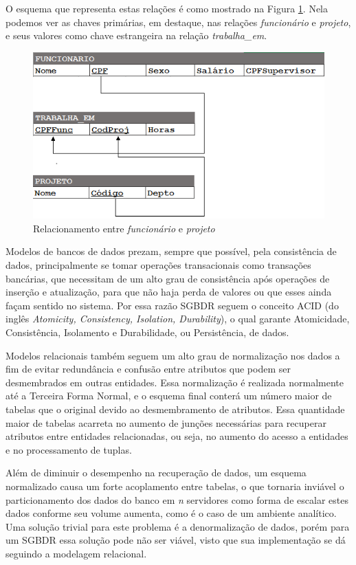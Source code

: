 O esquema que representa estas relações é como mostrado na Figura \ref{fig:relacao_func_proj}. Nela podemos ver as chaves primárias, em destaque, nas relações \textit{funcionário} e \textit{projeto}, e seus valores como chave estrangeira na relação \textit{trabalha\_em}. 

\begin{figure}[htpb]
	\centering
		\includegraphics[width=13cm]{relacao_func_proj}
	\caption{Relacionamento entre \textit{funcionário} e \textit{projeto}}
	\label{fig:relacao_func_proj}
\end{figure}

Modelos de bancos de dados prezam, sempre que possível, pela consistência de dados, principalmente se tomar operações transacionais como transações bancárias, que necessitam de um alto grau de consistência após operações de inserção e atualização, para que não haja perda de valores ou que esses ainda façam sentido no sistema. Por essa razão SGBDR seguem o conceito ACID (do inglês \textit{Atomicity, Consistency, Isolation, Durability}), o qual garante Atomicidade, Consistência, Isolamento e Durabilidade, ou Persistência, de dados. 

Modelos relacionais também seguem um alto grau de normalização nos dados a fim de evitar redundância e confusão entre atributos que podem ser desmembrados em outras entidades. Essa normalização é realizada normalmente até a Terceira Forma Normal, e o esquema final conterá um número maior de tabelas que o original devido ao desmembramento de atributos. Essa quantidade maior de tabelas acarreta no aumento de junções necessárias para recuperar atributos entre entidades relacionadas, ou seja, no aumento do acesso a entidades e no processamento de tuplas.

Além de diminuir o desempenho na recuperação de dados, um esquema normalizado causa um forte acoplamento entre tabelas, o que tornaria inviável o particionamento dos dados do banco em \textit{n} servidores como forma de escalar estes dados conforme seu volume aumenta, como é o caso de um ambiente analítico. Uma solução trivial para este problema é a denormalização de dados, porém para um SGBDR essa solução pode não ser viável, visto que sua implementação se dá seguindo a modelagem relacional.

